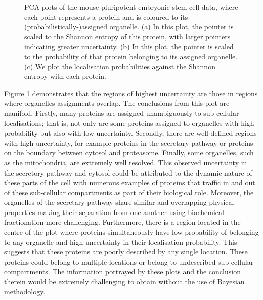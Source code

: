 \documentclass[12pt,english]{article}\usepackage[]{graphicx}\usepackage[]{color}
\newenvironment{knitrout}{}{} %
\begin{document}
\begin{figure}[h]
\begin{subfigure}[t]{0.5\textwidth}
\begin{knitrout}
{}



\end{knitrout}
    \caption{}
  \end{subfigure}

  \caption{PCA plots of the mouse pluripotent embryonic stem cell data, where
    each point represents a protein and is coloured
    to its (probabilistically-)assigned organelle. (a) In this plot, the pointer is
    scaled to the Shannon entropy of this protein, with
    larger pointers indicating greater uncertainty.
    (b) In this plot, the pointer is scaled to the probability
    of that protein belonging to its assigned organelle. (c) We plot
    the localisation probabilities against the Shannon entropy
    with each protein.}
  \label{figure:proteomeuncertainty}
 \end{figure}

Figure \ref{figure:proteomeuncertainty} demonstrates that the regions
of highest uncertainty are those in regions where organelles assignments
overlap. The conclusions from this plot are manifold. Firstly, many proteins are
assigned unambiguously to sub-cellular localisations; that is, not only
are some proteins assigned to organelles with high probability but also with
low uncertainty. Secondly, there are well defined regions with high uncertainty,
for example proteins in the secretary pathway or proteins on the boundary
between cytosol and proteasome. Finally, some organelles, such as the mitochondria,
are extremely well resolved. This observed uncertainty in the secretory pathway and cytosol
could be attributed to the dynamic nature of these parts of the cell with numerous examples of proteins
that traffic in and out of these sub-cellular compartments as part of their biological role. Moreover, the organelles of the secretary pathway share similar and overlapping physical properties making their separation from one another using biochemical fractionation more challenging.
Furthermore, there is a region
located in the centre of the plot where proteins simultaneously have low probability
of belonging to any organelle and high uncertainty in their localisation probability.
This suggests that these
proteins are poorly described by any single location. These proteins could belong to multiple
locations or belong to undescribed sub-cellular compartments. The information
portrayed by these plots and the conclusion therein would be extremely challenging
to obtain without the use of Bayesian methodology.


\clearpage
\end{document}
